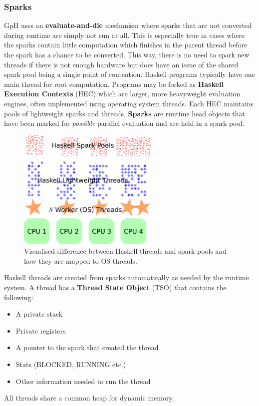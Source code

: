 \documentclass[CS4204-Notes.tex]{subfiles}
\begin{document}
\subsubsection{Sparks}
GpH uses an \textbf{evaluate-and-die} mechanism where sparks that are not converted during runtime are simply not run at all. This is especially true in cases where the sparks contain little computation which finishes in the parent thread before the spark has a chance to be converted. This way, there is no need to spark new threads if there is not enough hardware but does have an issue of the shared spark pool being a single point of contention. 
\n
Haskell programs typically have one main thread for root computation. Programs may be forked as \textbf{Haskell Execution Contexts} (HEC) which are larger, more heavyweight evaluation engines, often implemented using operating system threads. Each HEC maintains pools of lightweight sparks and threads. \textbf{Sparks} are runtime head objects that have been marked for \textit{possible} parallel evaluation and are held in a spark pool. 
\begin{figure}[H]
\centering
\includegraphics[width=0.6\textwidth, keepaspectratio]{imgs/haskell-threads.png}
\caption{Visualised difference between Haskell threads and spark pools and how they are mapped to OS threads.}
\end{figure}
\noindent
Haskell threads are created from sparks automatically as needed by the runtime system. A thread has a \textbf{Thread State Object} (TSO) that contains the following:
\begin{itemize}
\item A private stack
\item Private registers
\item A pointer to the spark that created the thread
\item Stats (BLOCKED, RUNNING etc.)
\item Other information needed to run the thread
\end{itemize}
All threads share a common heap for dynamic memory. 
\end{document}
